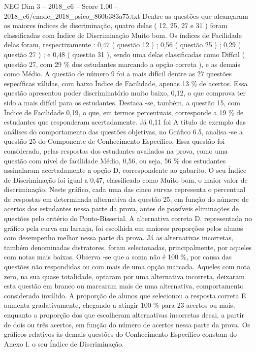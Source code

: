 \begin{textsample}{NEG Dim 3 – 2018\_c6 – Score 1.00 – 2018\_c6/enade\_2018\_psico\_860b383a75.txt}
Dentre as questões que alcançaram os maiores índices de discriminação, quatro delas ( 12, 25, 27 e 31 ) foram classificadas com Índice de Discriminação Muito bom.
Os índices de Facilidade delas foram, respectivamente : 0,47 ( questão 12 ) ; 0,56 ( questão 25 ) ; 0,29 ( questão 27 ) ; e 0,48 ( questão 31 ), sendo uma delas classificadas como Difícil ( questão 27, com 29 \% dos estudantes marcando a opção correta ), e as demais como Médio.
A questão de número 9 foi a mais difícil dentre as 27 questões específicas válidas, com baixo Índice de Facilidade, apenas 13 \% de acertos.
Essa questão apresentou poder discriminatório muito baixo, 0,12, o que comprova ter sido a mais difícil para os estudantes.
Destaca -se, também, a questão 15, com Índice de Facilidade 0,19, o que, em termos percentuais, corresponde a 19 \% de estudantes que responderam acertadamente.
Já 0,11 foi A título de exemplo das análises do comportamento das questões objetivas, no Gráfico 6.5, analisa -se a questão 25 do Componente de Conhecimento Específico.
Essa questão foi considerada, pelas respostas dos estudantes avaliados na prova, como uma questão com nível de facilidade Médio, 0,56, ou seja, 56 \% dos estudantes assinalaram acertadamente a opção D, correspondente ao gabarito.
O seu Índice de Discriminação foi igual a 0,47, classificado como Muito bom, o maior valor de discriminação.
Neste gráfico, cada uma das cinco curvas representa o percentual de respostas em determinada alternativa da questão 25, em função do número de acertos dos estudantes nessa parte da prova, antes de possíveis eliminações de questões pelo critério do Ponto-Bisserial.
A alternativa correta D, representada no gráfico pela curva em laranja, foi escolhida em maiores proporções pelos alunos com desempenho melhor nessa parte da prova.
Já as alternativas incorretas, também denominadas distratores, foram selecionadas, principalmente, por aqueles com notas mais baixas.
Observa -se que a soma não é 100 \%, por causa das questões não respondidas ou com mais de uma opção marcada.
Aqueles com nota zero, na sua quase totalidade, optaram por uma alternativa incorreta, deixaram esta questão em branco ou marcaram mais de uma alternativa, comportamento considerado inválido.
A proporção de alunos que selecionou a resposta correta E aumenta gradativamente, chegando a atingir 100 \% para 23 acertos ou mais, enquanto a proporção dos que escolheram alternativas incorretas decai, a partir de dois ou três acertos, em função do número de acertos nessa parte da prova.
Os gráficos relativos às demais questões do Conhecimento Específico constam do Anexo I. o seu Índice de Discriminação.

\end{textsample}
